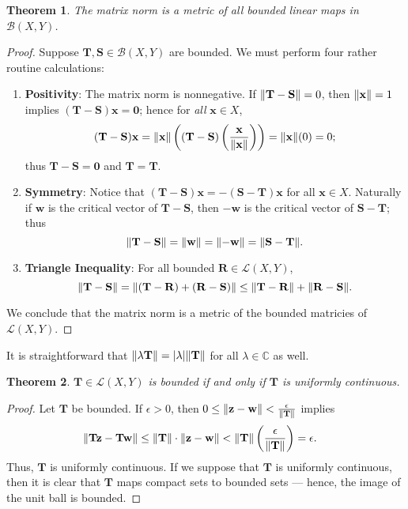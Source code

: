 \documentclass[11pt]{article}
\newtheorem{theorem}{Theorem}
\renewcommand{\vec}[1]{\mathbf{#1}}
\newcommand{\mat}[1]{\mathbf{#1}}
\begin{document}
\begin{theorem}
  The matrix norm is a metric of all bounded linear maps in $\mathcal{B}(X, Y)$.
\end{theorem}
\begin{adjustwidth}{0.5cm}{}
	\begin{proof}
		Suppose $\mat{T}, \mat{S} \in \mathcal{B}(X, Y)$ are bounded. We must perform four rather routine calculations:
		\begin{enumerate}
			\item \textbf{Positivity}: The matrix norm is nonnegative. If $\norm{\mat{T} - \mat{S}} = 0$, then $\norm{\vec{x}} = 1$ implies $(\mat{T} - \mat{S}) \vec{x} = \vec{0}$; hence for \textit{all} $\vec{x} \in X$,
			\[
				(\mat{T} - \mat{S}) \vec{x} = \norm{\vec{x}} \left( (\mat{T} - \mat{S}) \left( \frac{\vec{\vec{x}}}{\norm{\vec{x}}} \right) \right) = \norm{\vec{x}} (0) = 0;
			\]	
			thus $\mat{T} - \mat{S} = \mat{0}$ and $\mat{T} = \mat{T}$.
			\item \textbf{Symmetry}: Notice that $(\mat{T} - \mat{S}) \vec{x} = - (\mat{S} - \mat{T}) \vec{x}$ for all $\vec{x} \in X$. Naturally if $\vec{w}$ is the critical vector of $\mat{T} - \mat{S}$, then $- \vec{w}$ is the critical vector of $\mat{S} - \mat{T}$; thus
			\[
				\norm{\mat{T} - \mat{S}} = \norm{\vec{w}} = \norm{-\vec{w}} = \norm{\mat{S} - \mat{T}}.
			\]	
			\item \textbf{Triangle Inequality}: For all bounded $\mat{R} \in \mathcal{L}(X, Y)$,
			\[
				\norm{\mat{T - S}} = \norm{\mat{(T - R) + (R - S)}} \le \norm{\mat{T - R}} + \norm{\mat{R - S}}.
			\]
		\end{enumerate}
		We conclude that the matrix norm is a metric of the bounded matricies of $\mathcal{L}(X, Y)$.
	\end{proof}
\end{adjustwidth}

It is straightforward that $\norm{\lambda \mat{T}} = \abs{\lambda} \norm{\mat{T}}$ for all $\lambda \in \mathbb{C}$ as well.

\begin{theorem}
	$\mat{T} \in \mathcal{L}(X, Y)$ is bounded if and only if $\mat{T}$ is uniformly continuous.
\end{theorem}
\begin{adjustwidth}{0.5cm}{}
  \begin{proof}
    Let $\mat{T}$ be bounded. If $\epsilon > 0$, then $0 \le \norm{\vec{z} - \vec{w}} < \tfrac{\epsilon}{\norm{\mat{T}}}$ implies
		\begin{align*}
			\norm{\mat{T} \vec{z} - \mat{T} \vec{w}} &\le \norm{\mat{T}} \cdot \norm{\vec{z} - \vec{w}} < \norm{\mat{T}} \left( \frac{\epsilon}{\norm{\mat{T}}} \right) = \epsilon.
		\end{align*}
		Thus, $\mat{T}$ is uniformly continuous. If we suppose that $\mat{T}$ is uniformly continuous, then it is clear that $\mat{T}$ maps compact sets to bounded sets --- hence, the image of the unit ball is bounded.
	\end{proof}
\end{adjustwidth}
\end{document}
